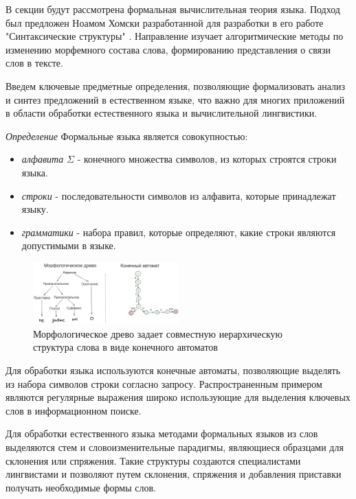 В секции будут рассмотрена формальная вычислительная теория языка.
Подход был предложен Ноамом Хомски разработанной для разработки
в его работе "Синтаксические структуры" \cite{chomsky2002syntactic}. Направление изучает алгоритмические 
методы по изменению морфемного состава слова, формированию представления о связи слов в тексте.

Введем ключевые предметные определения, позволяющие формализовать анализ и 
синтез предложений в естественном языке, что важно для многих приложений 
в области обработки естественного языка и вычислительной лингвистики.
 
\textit{Определение} Формальные языка является совокупностью:
\begin{itemize}
    \item \textit{алфавита} $\Sigma$ - конечного множества символов, из которых строятся строки языка.
    \item \textit{строки} - последовательности символов из алфавита, которые принадлежат языку.
    \item \textit{грамматики} - набора правил, которые определяют, какие строки являются допустимыми в языке.
\end{itemize}

\begin{figure}[h]
    \centering
    \includegraphics[width=0.5\textwidth]{assets/ml/nlp/morph_tree.excalidraw.png}
    \caption{Морфологическое древо задает совместную иерархическую структура слова в виде конечного автоматов}
    \label{morph}
\end{figure}

Для обработки языка используются конечные автоматы, позволяющие выделять из набора символов строки согласно запросу. 
Распространенным примером являются регулярные выражения широко использующие для выделения ключевых слов в информационном поиске.

Для обработки естественного языка методами формальных языков из слов выделяются стем и словоизменительные парадигмы, являющиеся 
образцами для склонения или спряжения. Такие структуры создаются специалистами лингвистами и позволяют путем склонения,
спряжения и добавления приставки получать необходимые формы слов.

